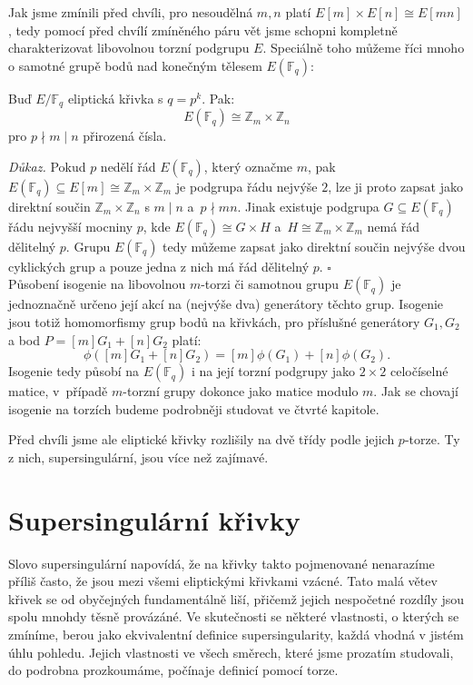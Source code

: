 \documentclass[12pt]{report}
\begin{document}
Jak jsme zmínili před chvíli, pro nesoudělná $m,n$ platí $E[m] \times E[n] \cong E[mn]$, tedy pomocí před chvílí zmíněného páru vět jsme schopni kompletně charakterizovat libovolnou torzní podgrupu $E$. Speciálně toho můžeme říci mnoho o samotné grupě bodů nad konečným tělesem $E(\mathbb{F}_q)$:

\begin{veta}
Buď $E/\mathbb{F}_q$ eliptická křivka s $q = p^k$. Pak:
\begin{equation*}
E(\mathbb{F}_q) \cong \mathbb{Z}_m \times \mathbb{Z}_n
\end{equation*}
pro $p \nmid m \mid n$ přirozená čísla.
\end{veta}
\noindent \textit{Důkaz.} Pokud $p$ nedělí řád $E(\mathbb{F}_q)$, který označme $m$, pak $E(\mathbb{F}_q) \subseteq E[m] \cong \mathbb{Z}_m \times \mathbb{Z}_m$ je podgrupa řádu nejvýše $2$, lze ji proto zapsat jako direktní součin $\mathbb{Z}_m \times \mathbb{Z}_n$ s $m \mid n$ a~$p \nmid mn$. Jinak existuje podgrupa $G \subseteq E(\mathbb{F}_q)$ řádu nejvyšší mocniny $p$, kde $E(\mathbb{F}_q) \cong G \times H$ a~$H \cong \mathbb{Z}_m \times \mathbb{Z}_m$ nemá řád dělitelný $p$. Grupu $E(\mathbb{F}_q)$ tedy můžeme zapsat jako direktní součin nejvýše dvou cyklických grup a pouze jedna z nich má řád dělitelný $p$. \hfill $\square$\\

Působení isogenie na libovolnou $m$-torzi či samotnou grupu $E(\mathbb{F}_q)$ je jednoznačně určeno její akcí na (nejvýše dva) generátory těchto grup. Isogenie jsou totiž homomorfismy grup bodů na křivkách, pro příslušné generátory $G_1,G_2$ a bod $P = [m] G_1 + [n] G_2$ platí:
\begin{equation*}
\phi([m]G_1+[n]G_2) = [m] \phi (G_1 )+ [n] \phi (G_2).
\end{equation*}
Isogenie tedy působí na $E(\mathbb{F}_q)$ i na její torzní podgrupy jako $2 \times 2$ celočíselné matice, v~případě $m$-torzní grupy dokonce jako matice modulo $m$. Jak se chovají isogenie na torzích budeme podrobněji studovat ve čtvrté kapitole.

Před chvíli jsme ale eliptické křivky rozlišily na dvě třídy podle jejich $p$-torze. Ty  z nich, supersingulární, jsou více než zajímavé.

\section{Supersingulární křivky}

Slovo supersingulární napovídá, že na křivky takto pojmenované nenarazíme příliš často, že jsou mezi všemi eliptickými křivkami vzácné. Tato malá větev křivek se od obyčejných fundamentálně liší, přičemž jejich nespočetné rozdíly jsou spolu mnohdy těsně provázáné. Ve skutečnosti se některé vlastnosti, o kterých se zmíníme, berou jako ekvivalentní definice supersingularity, každá vhodná v jistém úhlu pohledu. Jejich vlastnosti ve všech směrech, které jsme prozatím studovali, do podrobna prozkoumáme, počínaje definicí pomocí torze.
\end{document}

